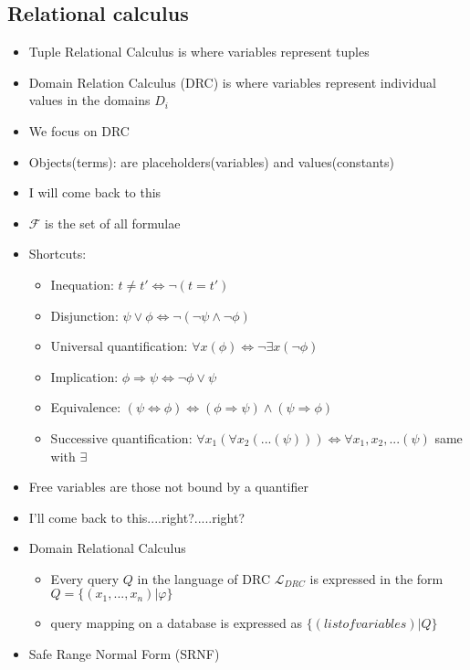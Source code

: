 \documentclass[10pt,a4paper]{article}
\begin{document}
	\subsection{Relational calculus}
		\begin{itemize}
			\item Tuple Relational Calculus is where variables represent tuples
			\item Domain Relation Calculus (DRC) is where variables represent individual values in the domains $D_i$
			\item We focus on DRC
			\item Objects(terms): are placeholders(variables) and values(constants)
			\item I will come back to this
			\item $\mathcal{F}$ is the set of all formulae
			\item Shortcuts:
			\begin{itemize}
				\item Inequation: $t\neq t' \Leftrightarrow \neg(t=t')$
				\item Disjunction: $\psi\vee\phi \Leftrightarrow \neg(\neg\psi\wedge\neg\phi)$
				\item Universal quantification: $\forall x(\phi) \Leftrightarrow \neg\exists x(\neg\phi)$
				\item Implication: $\phi\Rightarrow\psi \Leftrightarrow \neg\phi\vee\psi$
				\item Equivalence: $(\psi\Leftrightarrow\phi) \Leftrightarrow  (\phi\Rightarrow\psi)\wedge(\psi\Rightarrow\phi)$
				\item Successive quantification: $\forall x_1(\forall x_2(...(\psi))) \Leftrightarrow \forall x_1,x_2,...(\psi)$ same with $\exists$
			\end{itemize}
			\item Free variables are those not bound by a quantifier 
			\item I'll come back to this....right?.....right?
			\item Domain Relational Calculus
			\begin{itemize}
				\item Every query $Q$ in the language of DRC $\mathcal{L}_{DRC}$ is expressed in the form $Q = \{(x_1,...,x_n)|\varphi\}$
				\item query mapping on a database is expressed as $\{(list of variables)|Q\}$
			\end{itemize}
			\item Safe Range Normal Form (SRNF)
			\begin{itemize}

\end{itemize}
\end{itemize}
\end{document}
